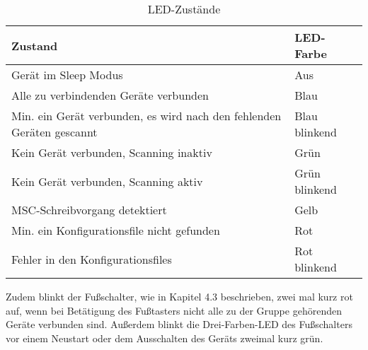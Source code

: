 \begin{table}[H]
	\centering
	\begin{tabular}[H]{l|l}
		Zustand & \ac{LED}-Farbe \\
		\hline
		Gerät im Sleep Modus & Aus \\
		\hline
		Alle zu verbindenden Geräte verbunden & Blau \\
		\hline
		Min. ein Gerät verbunden, es wird nach den fehlenden Geräten gescannt & Blau blinkend \\
		\hline
		Kein Gerät verbunden, Scanning inaktiv & Grün \\
		\hline
		Kein Gerät verbunden, Scanning aktiv & Grün blinkend \\
		\hline
		\ac{MSC}-Schreibvorgang detektiert & Gelb \\
		\hline
		Min. ein Konfigurationsfile nicht gefunden & Rot \\
		\hline
		Fehler in den Konfigurationsfiles & Rot blinkend \\
	\end{tabular}
	\caption{LED-Zustände}
\end{table}

Zudem blinkt der Fußschalter, wie in Kapitel 4.3 beschrieben, zwei mal kurz rot auf, wenn bei Betätigung des Fußtasters nicht alle zu der Gruppe gehörenden Geräte verbunden sind. Außerdem blinkt die Drei-Farben-\ac{LED} des Fußschalters vor einem Neustart oder dem Ausschalten des Geräts zweimal kurz grün.